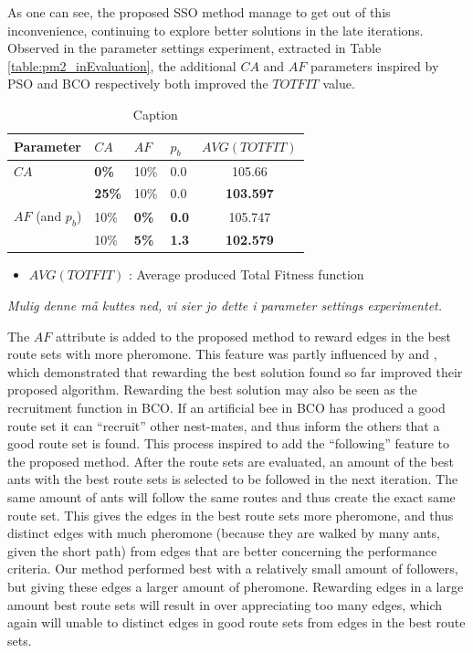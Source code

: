 As one can see, the proposed SSO method manage to get out of this inconvenience, continuing to explore better solutions in the late iterations. Observed in the parameter settings experiment, extracted in Table \vref{table:pm2_inEvaluation}, the additional $CA$ and $AF$ parameters inspired by PSO and BCO respectively both improved the $TOTFIT$ value. 

\begin{table}
    \centering
    \begin{tabular}{|l|l|l|l||c|}
    \hline
    Parameter & $CA$ & $AF$ & $p_b$ & $AVG(TOTFIT)$ \\
    \hline
    $CA$ & \textbf{0\%} & 10\% & 0.0 & 105.66\\
    ~ & \textbf{25\%} & 10\% & 0.0 & \textbf{103.597}\\
    \hline
    $AF$ (and $p_b$) & 10\% & \textbf{0\%} & \textbf{0.0} & 105.747 \\
    ~ & 10\% & \textbf{5\%} & \textbf{1.3} & \textbf{102.579}\\
    \hline
    \end{tabular}
    \caption {Caption}
    \tiny
    \begin{itemize}[noitemsep]
    \item[ ] $AVG(TOTFIT)$ : Average produced Total Fitness function
    \end{itemize}
    \label{table:pm2_inEvaluation}
\end{table}
\emph{\color{blue}Mulig denne må kuttes ned, vi sier jo dette i parameter settings experimentet.}

The $AF$ attribute is added to the proposed method to reward edges in the best route sets with more pheromone. This feature was partly influenced by \citet{tripathi09} and \citet{sedighpour14}, which demonstrated that rewarding the best solution found so far improved their proposed algorithm. Rewarding the best solution may also be seen as the recruitment function in BCO. If an artificial bee in BCO has produced a good route set it can ``recruit'' other nest-mates, and thus inform the others that a good route set is found. This process inspired to add the ``following'' feature to the proposed method. After the route sets are evaluated, an amount of the best ants with the best route sets is selected to be followed in the next iteration. The same amount of ants will follow the same routes and thus create the exact same route set. This gives the edges in the best route sets more pheromone, and thus distinct edges with much pheromone (because they are walked by many ants, given the short path) from edges that are better concerning the performance criteria. Our method performed best with a relatively small amount of followers, but giving these edges a larger amount of pheromone.  Rewarding edges in a large amount best route sets will result in over appreciating too many edges, which again will unable to distinct edges in good route sets from edges in the best route sets. 


